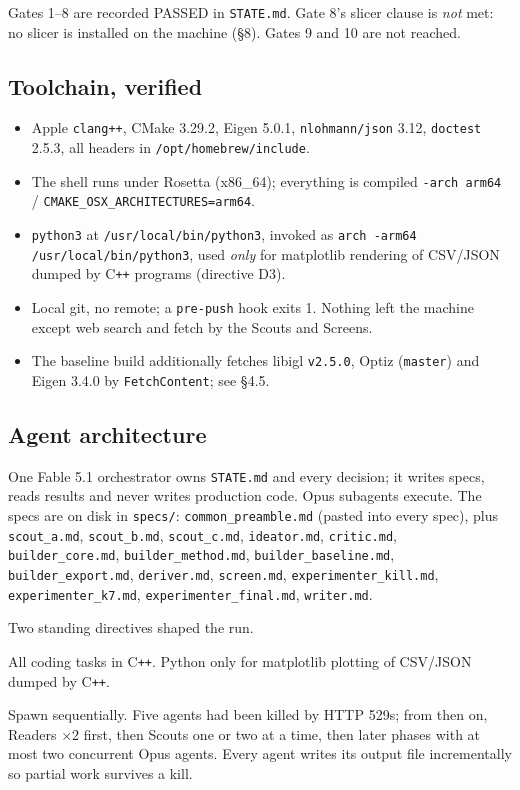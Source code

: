 \documentclass[10pt,a4paper]{article}
\newcommand{\fn}[1]{\nolinkurl{#1}}
\begin{document}
Gates 1--8 are recorded PASSED in \fn{STATE.md}. Gate 8's slicer clause is \emph{not} met: no
slicer is installed on the machine (\S8). Gates 9 and 10 are not reached.

\subsection{Toolchain, verified}

\begin{itemize}[nosep,leftmargin=5mm]
\item Apple \texttt{clang++}, CMake 3.29.2, Eigen 5.0.1, \texttt{nlohmann/json} 3.12,
      \texttt{doctest} 2.5.3, all headers in \fn{/opt/homebrew/include}.
\item The shell runs under Rosetta (x86\_64); everything is compiled
      \texttt{-arch arm64} / \fn{CMAKE_OSX_ARCHITECTURES=arm64}.
\item \fn{python3} at \fn{/usr/local/bin/python3}, invoked as
      \fn{arch -arm64 /usr/local/bin/python3}, used \emph{only} for matplotlib rendering of
      CSV/JSON dumped by C\texttt{++} programs (directive D3).
\item Local git, no remote; a \texttt{pre-push} hook exits 1. Nothing left the machine except
      web search and fetch by the Scouts and Screens.
\item The baseline build additionally fetches libigl \texttt{v2.5.0}, Optiz (\texttt{master})
      and Eigen 3.4.0 by \texttt{FetchContent}; see \S4.5.
\end{itemize}

\subsection{Agent architecture}

One Fable 5.1 orchestrator owns \fn{STATE.md} and every decision; it writes specs, reads
results and never writes production code. Opus subagents execute. The specs are on disk in
\fn{specs/}: \fn{common_preamble.md} (pasted into every spec), plus
\fn{scout_a.md}, \fn{scout_b.md}, \fn{scout_c.md}, \fn{ideator.md}, \fn{critic.md},
\fn{builder_core.md}, \fn{builder_method.md}, \fn{builder_baseline.md}, \fn{builder_export.md},
\fn{deriver.md}, \fn{screen.md}, \fn{experimenter_kill.md}, \fn{experimenter_k7.md},
\fn{experimenter_final.md}, \fn{writer.md}.

Two standing directives shaped the run.

\begin{description}[nosep,leftmargin=8mm]
\item[D3 (human, 2026-09-03).] All coding tasks in C\texttt{++}. Python only for matplotlib
      plotting of CSV/JSON dumped by C\texttt{++}.
\item[D4 (human).] Spawn sequentially. Five agents had been killed by HTTP 529s; from then on,
      Readers $\times 2$ first, then Scouts one or two at a time, then later phases with at most
      two concurrent Opus agents. Every agent writes its output file incrementally so partial
      work survives a kill.
\end{description}
\end{document}
